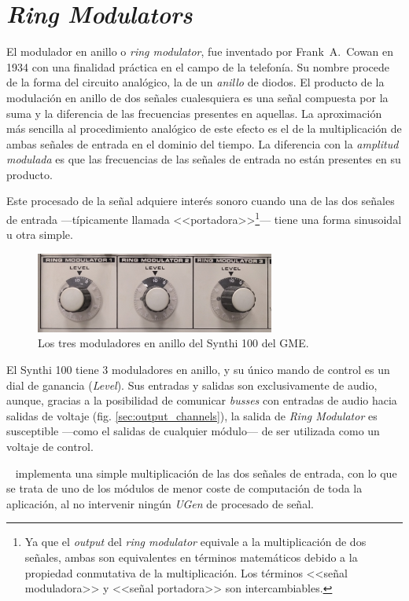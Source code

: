 \section[\textit{Ring Modulators}]{\textit{Ring Modulators}}
\label{sec:ring_modulators}

El modulador en anillo o \textit{ring modulator}, fue inventado por Frank~A.~Cowan en 1934 con una finalidad práctica en el campo de la telefonía. Su nombre procede de la forma del circuito analógico, la de un \textit{anillo} de diodos. El producto de la modulación en anillo de dos señales cualesquiera es una señal compuesta por la suma y la diferencia de las frecuencias presentes en aquellas. La aproximación más sencilla al procedimiento analógico de este efecto es el de la multiplicación de ambas señales de entrada en el dominio del tiempo. La diferencia con la \textit{amplitud modulada} es que las frecuencias de las señales de entrada no están presentes en su producto. 

Este procesado de la señal adquiere interés sonoro cuando una de las dos señales de entrada ---típicamente llamada <<portadora>>\footnote{Ya que el \textit{output} del \textit{ring modulator} equivale a la multiplicación de dos señales, ambas son equivalentes en términos matemáticos debido a la propiedad conmutativa de la multiplicación. Los términos <<señal moduladora>> y <<señal portadora>> son intercambiables.}--- tiene una forma sinusoidal u otra simple. 

\begin{figure}
	\centering
	\includegraphics[width=0.7\textwidth]{images/ring_modulators}
	\caption[\textit{Ring Modulators}]{Los tres moduladores en anillo del Synthi 100 del GME.}
	\label{fig:ring_modulators}
\end{figure}

El Synthi 100 tiene 3 moduladores en anillo, y su único mando de control es un dial de ganancia (\textit{Level}). Sus entradas y salidas son exclusivamente de audio, aunque, gracias a la posibilidad de comunicar \textit{busses} con entradas de audio hacia salidas de voltaje (fig. \ref{sec:output_channels}), la salida de \textit{Ring Modulator} es susceptible ---como el salidas de cualquier módulo--- de ser utilizada como un voltaje de control.

\appName~ implementa una simple multiplicación de las dos señales de entrada, con lo que se trata de uno de los módulos de menor coste de computación de toda la aplicación, al no intervenir ningún \textit{UGen} de procesado de señal.